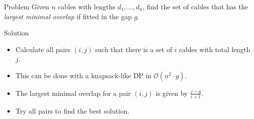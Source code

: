\begin{slide}
    \begin{block}{Problem}
      Given $n$ cables with lengths $d_1,\dots,d_n$, find the set of cables that has the \emph{largest minimal overlap} if fitted in the gap $g$.
    \end{block}
    \pause
    \begin{block}{Solution}
        \begin{itemize}
          \item Calculate all pairs $(i,j)$ such that there is a set of $i$ cables with total length $j$.
          \item This can be done with a knapsack-like DP in $\mathcal{O}(n^2 \cdot g)$.
          \item The largest minimal overlap for a pair $(i,j)$ is given by $\frac{j-g}{i+1}.$
          \item Try all pairs to find the best solution.
        \end{itemize}
    \end{block}
\end{slide} 

